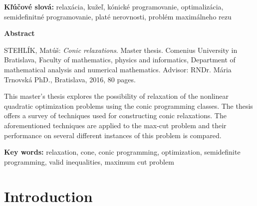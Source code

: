 \documentclass[12pt]{book}
\theoremstyle{definition}
\begin{document}
\bigskip

{\bf Kľúčové slová: }relaxácia, kužeľ, kónické programovanie, optimalizácia, se\-mi\-de\-fi\-ni\-tné programovanie, platé nerovnosti, problém maximálneho rezu \\

\newpage

{\large\bf Abstract}

\medskip

STEHLÍK, Matúš: {\it Conic relaxations}. Master thesis. Comenius University in Bratislava, Faculty of mathematics, physics and informatics, Department of mathematical analysis and numerical mathematics. Advisor:  RNDr. Mária Trnovská PhD., Bratislava, 2016, 80 pages.

\bigskip
This master's thesis explores the possibility of relaxation of the nonlinear quadratic
optimization problems using the conic programming classes. The thesis offers a
survey of techniques used for constructing conic relaxations.
The aforementioned techniques are applied to the max-cut problem and their performance on several different  instances of this problem is compared.

%


\bigskip

{\bf Key words: } relaxation, cone, conic programming, optimization, semidefinite programming, valid inequalities, maximum cut problem

\vfill\null\eject

\begin{spacing}{0.95}
\tableofcontents
\listoffigures
\begingroup
\let\clearpage\relax
\listoftables
\endgroup
\end{spacing}

\mainmatter

\chapter*{Introduction}
\end{document}
